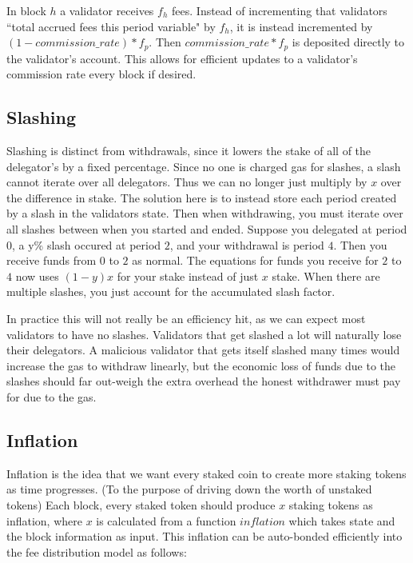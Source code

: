 \documentclass[]{article}
\begin{document}
In block $h$ a validator receives $f_h$ fees.
Instead of incrementing that validators ``total accrued fees this period variable" by $f_h$, it is instead incremented by $(1 - commission\_rate) * f_p$.
Then $commission\_rate * f_p$ is deposited directly to the validator's account.
This allows for efficient updates to a validator's commission rate every block if desired.

\subsection{Slashing}
\label{ssec:slashing}
Slashing is distinct from withdrawals, since it lowers the stake of all of the delegator's by a fixed percentage.
Since no one is charged gas for slashes, a slash cannot iterate over all delegators.
Thus we can no longer just multiply by $x$ over the difference in stake. 
The solution here is to instead store each period created by a slash in the validators state.
Then when withdrawing, you must iterate over all slashes between when you started and ended.
Suppose you delegated at period $0$, a y\% slash occured at period $2$, and your withdrawal is period $4$.
Then you receive funds from $0$ to $2$ as normal.
The equations for funds you receive for $2$ to $4$ now uses $(1 - y)x$ for your stake instead of just $x$ stake.
When there are multiple slashes, you just account for the accumulated slash factor.

In practice this will not really be an efficiency hit, as we can expect most validators to have no slashes.
Validators that get slashed a lot will naturally lose their delegators.
A malicious validator that gets itself slashed many times would increase the gas to withdraw linearly, but the economic loss of funds due to the slashes should far out-weigh the extra overhead the honest withdrawer must pay for due to the gas.

\subsection{Inflation}
Inflation is the idea that we want every staked coin to create more staking tokens as time progresses. (To the purpose of driving down the worth of unstaked tokens) Each block, every staked token should produce $x$ staking tokens as inflation, where $x$ is calculated from a function $inflation$ which takes state and the block information as input. This inflation can be auto-bonded efficiently into the fee distribution model as follows:
\end{document}
